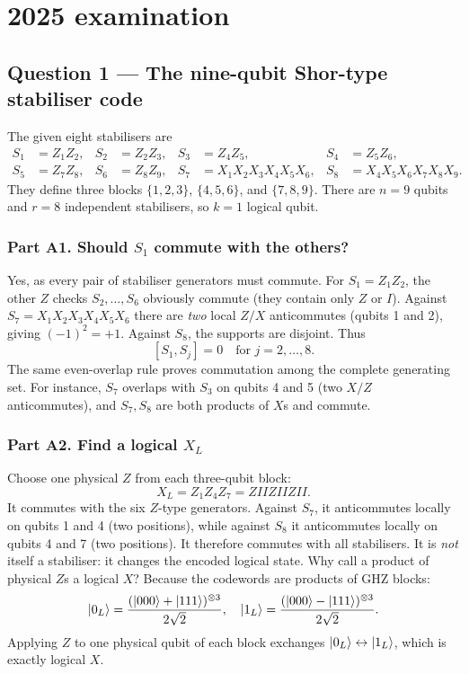 \clearpage
\section{2025 examination}
\subsection{Question 1 --- The nine-qubit Shor-type stabiliser code}
The given eight stabilisers are
\begin{align*}
S_1&=Z_1Z_2,&S_2&=Z_2Z_3,&S_3&=Z_4Z_5,&S_4&=Z_5Z_6,\\
S_5&=Z_7Z_8,&S_6&=Z_8Z_9,&S_7&=X_1X_2X_3X_4X_5X_6,&S_8&=X_4X_5X_6X_7X_8X_9.
\end{align*}
They define three blocks $\{1,2,3\}$, $\{4,5,6\}$, and $\{7,8,9\}$. There are $n=9$ qubits and $r=8$ independent stabilisers, so $k=1$ logical qubit.

\subsubsection*{Part A1. Should $S_1$ commute with the others?}
Yes, as every pair of stabiliser generators must commute. For $S_1=Z_1Z_2$, the other $Z$ checks $S_2,\ldots,S_6$ obviously commute (they contain only $Z$ or $I$). Against $S_7=X_1X_2X_3X_4X_5X_6$ there are \emph{two} local $Z/X$ anticommutes (qubits 1 and 2), giving $(-1)^2=+1$. Against $S_8$, the supports are disjoint. Thus
\begin{equation}\boxed{[S_1,S_j]=0\quad\text{for }j=2,\ldots,8.}\end{equation}
The same even-overlap rule proves commutation among the complete generating set. For instance, $S_7$ overlaps with $S_3$ on qubits 4 and 5 (two $X/Z$ anticommutes), and $S_7,S_8$ are both products of $X$s and commute.

\subsubsection*{Part A2. Find a logical $X_L$}
Choose one physical $Z$ from each three-qubit block:
\begin{equation}\boxed{X_L=Z_1Z_4Z_7=ZIIZIIZII.}\end{equation}
It commutes with the six $Z$-type generators. Against $S_7$, it anticommutes locally on qubits 1 and 4 (two positions), while against $S_8$ it anticommutes locally on qubits 4 and 7 (two positions). It therefore commutes with all stabilisers. It is \emph{not} itself a stabiliser: it changes the encoded logical state. Why call a product of physical $Z$s a logical $X$? Because the codewords are products of GHZ blocks:
\begin{equation}\left\lvert 0_L\right\rangle=\frac{(\left\lvert 000\right\rangle+\left\lvert 111\right\rangle)^{\otimes3}}{2\sqrt2},\quad
\left\lvert 1_L\right\rangle=\frac{(\left\lvert 000\right\rangle-\left\lvert 111\right\rangle)^{\otimes3}}{2\sqrt2}.\end{equation}
Applying $Z$ to one physical qubit of each block exchanges $\left\lvert 0_L\right\rangle\leftrightarrow\left\lvert 1_L\right\rangle$, which is exactly logical $X$.

